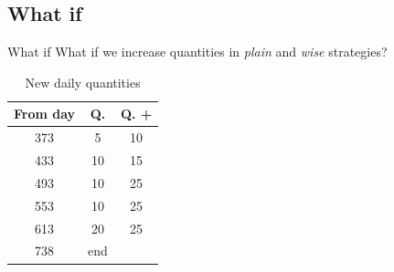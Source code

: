 \documentclass[9pt]{beamer}
\begin{document}
\subsection{What if}

\begin{frame}{What if}
\center
What if we increase quantities in \emph{plain} and \emph{wise} strategies?

\begin{table}[H]
\centering
\begin{small} %
\begin{tabular}{ccc}
\toprule
From day & Q. & Q. + \\
\midrule
373      & 5           & 10            \\
433      & 10         & 15            \\
493      & 10         & 25            \\
553      & 10         & 25            \\
613      & 20         & 25            \\
738      & end     \\ 
\bottomrule  
\end{tabular}
\end{small}
\caption{New daily quantities}
\label{quotaTablePlus}
\end{table}


\end{frame}

\end{document}
